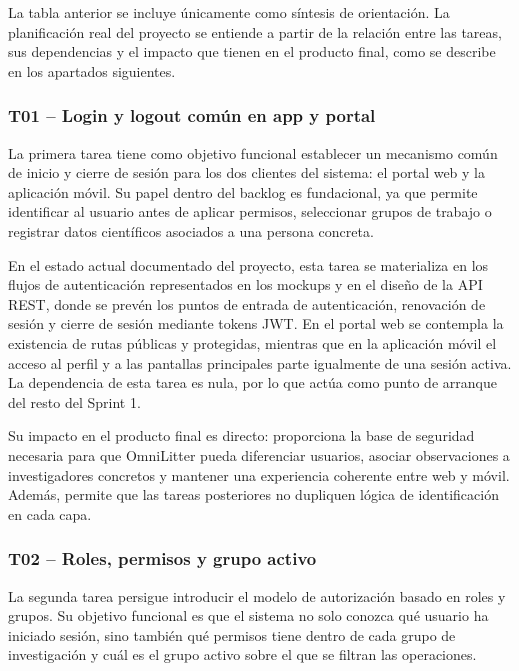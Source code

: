 La tabla anterior se incluye únicamente como síntesis de orientación. La
planificación real del proyecto se entiende a partir de la relación entre las
tareas, sus dependencias y el impacto que tienen en el producto final, como se
describe en los apartados siguientes.

\subsubsection{T01 -- Login y logout común en app y portal}

La primera tarea tiene como objetivo funcional establecer un mecanismo común de
inicio y cierre de sesión para los dos clientes del sistema: el portal web y la
aplicación móvil. Su papel dentro del backlog es fundacional, ya que permite
identificar al usuario antes de aplicar permisos, seleccionar grupos de trabajo o
registrar datos científicos asociados a una persona concreta.

En el estado actual documentado del proyecto, esta tarea se materializa en los
flujos de autenticación representados en los mockups y en el diseño de la API REST,
donde se prevén los puntos de entrada de autenticación, renovación de sesión y
cierre de sesión mediante tokens JWT. En el portal web se contempla la existencia
de rutas públicas y protegidas, mientras que en la aplicación móvil el acceso al
perfil y a las pantallas principales parte igualmente de una sesión activa. La
dependencia de esta tarea es nula, por lo que actúa como punto de arranque del
resto del Sprint 1.

Su impacto en el producto final es directo: proporciona la base de seguridad
necesaria para que OmniLitter pueda diferenciar usuarios, asociar observaciones a
investigadores concretos y mantener una experiencia coherente entre web y móvil.
Además, permite que las tareas posteriores no dupliquen lógica de identificación
en cada capa.

\subsubsection{T02 -- Roles, permisos y grupo activo}

La segunda tarea persigue introducir el modelo de autorización basado en roles y
grupos. Su objetivo funcional es que el sistema no solo conozca qué usuario ha
iniciado sesión, sino también qué permisos tiene dentro de cada grupo de
investigación y cuál es el grupo activo sobre el que se filtran las operaciones.

